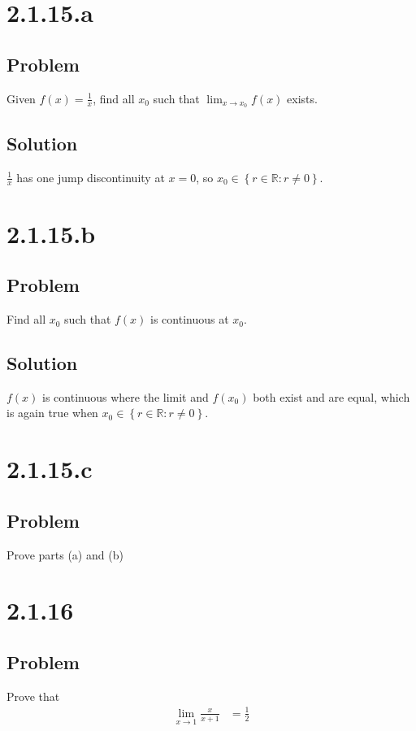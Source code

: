 \documentclass[12pt]{article}
\newcommand{\curly}[1]{\left\{      #1 \right\}     }
\begin{document}
\section*{2.1.15.a}

\subsection*{Problem}
Given $f(x) = \frac{1}{x}$, find all $x_0$ such that $\lim_{x \to x_0} f(x)$ exists.

\subsection*{Solution}
$\frac{1}{x}$ has one jump discontinuity at $x = 0$, so $x_0 \in \curly{r \in \mathbb{R} : r \neq 0}$.



\section*{2.1.15.b}

\subsection*{Problem}
Find all $x_0$ such that $f(x)$ is continuous at $x_0$.

\subsection*{Solution}
$f(x)$ is continuous where the limit and $f(x_0)$ both exist and are equal, which is again true when $x_0 \in \curly{r \in \mathbb{R} : r \neq 0}$.



\section*{2.1.15.c}

\subsection*{Problem}
Prove parts (a) and (b)



\section*{2.1.16}

\subsection*{Problem}
Prove that
\begin{align*}
    \lim_{x \to 1} \frac{x}{x + 1} &= \frac{1}{2}
\end{align*}
\end{document}
